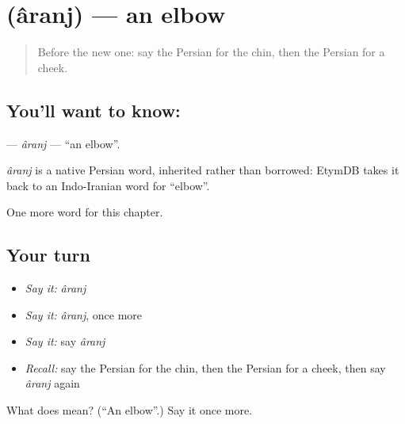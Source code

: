 \section[\texorpdfstring{\fa{آرنج} (âranj)}{آرنج (âranj)}]{ (âranj) — an elbow}

\label{lesson:FA-C107-aranj}



\begin{quote}
Before the new one: say the Persian for the chin, then the Persian for a cheek.
\end{quote}

\subsection*{You'll want to know: }
\textbf{} — \emph{âranj} — \textquotedblleft{}an elbow\textquotedblright{}.

\begin{cousinweb}
\emph{âranj} is a native Persian word, inherited rather than borrowed: EtymDB takes it back to an Indo-Iranian word for \textquotedblleft{}elbow\textquotedblright{}.
\end{cousinweb}

\begin{grammarlens}[title={What you've built}]
One more word for this chapter.
\end{grammarlens}

\subsection*{Your turn}
\begin{itemize}
\raggedright
  \item \emph{Say it:} \emph{âranj}
  \item \emph{Say it:} \emph{âranj}, once more
  \item \emph{Say it:} say \emph{âranj}
  \item \emph{Recall:} say the Persian for the chin, then the Persian for a cheek, then say \emph{âranj} again
\end{itemize}

\begin{tcolorbox}[breakable,colback=teal!4,colframe=teal!35!black,title={Before you move on}]
What does  mean? (\textquotedblleft{}An elbow\textquotedblright{}.) Say it once more.
\end{tcolorbox}
